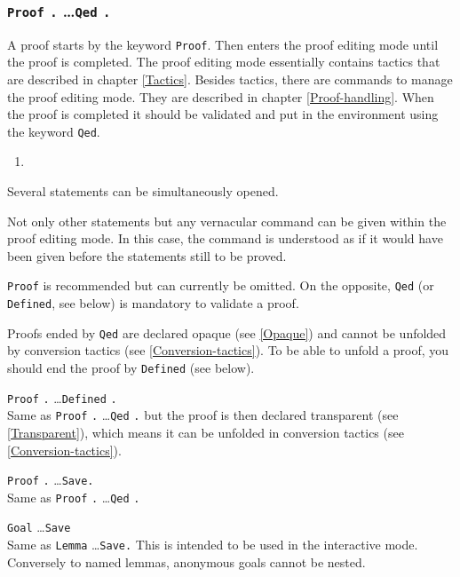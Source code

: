 \subsubsection{{\tt Proof} {\tt .} \dots {\tt Qed} {\tt .}}

A proof starts by the keyword {\tt Proof}.  Then {\Coq} enters the
proof editing mode until the proof is completed. The proof editing
mode essentially contains tactics that are described in chapter
\ref{Tactics}. Besides tactics, there are commands to manage the proof
editing mode. They are described in chapter \ref{Proof-handling}. When
the proof is completed it should be validated and put in the
environment using the keyword {\tt Qed}.
\medskip

\ErrMsg
\begin{enumerate}
\item {}
\end{enumerate}

\begin{Remarks}
\item Several statements can be simultaneously opened.
\item Not only other statements but any vernacular command can be given
within the proof editing mode. In this case, the command is
understood as if it would have been given before the statements still to be
proved. 
\item {\tt Proof} is recommended but can currently be omitted. On the
opposite, {\tt Qed} (or {\tt Defined}, see below) is mandatory to validate a proof.
\item Proofs ended by {\tt Qed} are declared opaque (see \ref{Opaque})
and cannot be unfolded by conversion tactics (see \ref{Conversion-tactics}).
To be able to unfold a proof, you should end the proof by {\tt Defined}
 (see below). 
\end{Remarks}

\begin{Variants}
\item {\tt Proof} {\tt .} \dots {\tt Defined} {\tt .}\\
  Same as {\tt Proof} {\tt .} \dots {\tt Qed} {\tt .} but the proof is
  then declared transparent (see \ref{Transparent}), which means it
  can be unfolded in conversion tactics (see \ref{Conversion-tactics}).
\item {\tt Proof} {\tt .} \dots {\tt Save.}\\
  Same as {\tt Proof} {\tt .} \dots {\tt Qed} {\tt .}
\item {\tt Goal} \type \dots {\tt Save} \ident \\
  Same as {\tt Lemma} \ident {\tt :} \type \dots {\tt Save.}
  This is intended to be used in the interactive mode. Conversely to named
  lemmas, anonymous goals cannot be nested.
\end{Variants}



